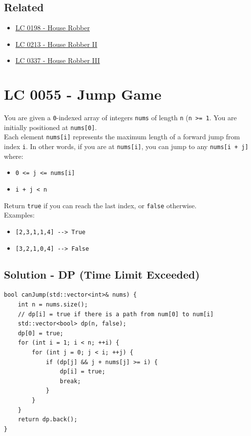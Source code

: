\subsection*{Related}
\begin{itemize}
\item \hyperref[lc0198]{LC 0198 - House Robber}
\item \hyperref[lc0213]{LC 0213 - House Robber II}
\item \hyperref[lc0337]{LC 0337 - House Robber III}
\end{itemize}

\section{LC 0055 - Jump Game}
You are given a {\colorbox{CodeBackground}{\lstinline|0|}}-indexed array of integers {\colorbox{CodeBackground}{\lstinline|nums|}} of length {\colorbox{CodeBackground}{\lstinline|n|}} ({\colorbox{CodeBackground}{\lstinline|n >= 1|}}. You are initially positioned at {\colorbox{CodeBackground}{\lstinline|nums[0]|}}. \\

Each element {\colorbox{CodeBackground}{\lstinline|nums[i]|}} represents the maximum length of a forward jump from index {\colorbox{CodeBackground}{\lstinline|i|}}. In other words, if you are at {\colorbox{CodeBackground}{\lstinline|nums[i]|}}, you can jump to any {\colorbox{CodeBackground}{\lstinline|nums[i + j]|}} where:
\begin{itemize}
	\item {\colorbox{CodeBackground}{\lstinline|0 <= j <= nums[i]|}}
	\item {\colorbox{CodeBackground}{\lstinline|i + j < n|}}
\end{itemize}

Return {\colorbox{CodeBackground}{\lstinline|true|}} if you can reach the last index, or {\colorbox{CodeBackground}{\lstinline|false|}} otherwise.\\

Examples:
\begin{itemize}
	\item {\colorbox{CodeBackground}{\lstinline|[2,3,1,1,4] --> True|}}
	\item {\colorbox{CodeBackground}{\lstinline|[3,2,1,0,4] --> False|}}
\end{itemize}

\subsection*{Solution - DP (Time Limit Exceeded)}\label{solution:lc0055_dp}
\begin{lstlisting}
bool canJump(std::vector<int>& nums) {
	int n = nums.size();
	// dp[i] = true if there is a path from num[0] to num[i]
	std::vector<bool> dp(n, false);
	dp[0] = true;
	for (int i = 1; i < n; ++i) {
		for (int j = 0; j < i; ++j) {
			if (dp[j] && j + nums[j] >= i) {
				dp[i] = true;
				break;
			}
		}
	}
	return dp.back();
}
\end{lstlisting}

